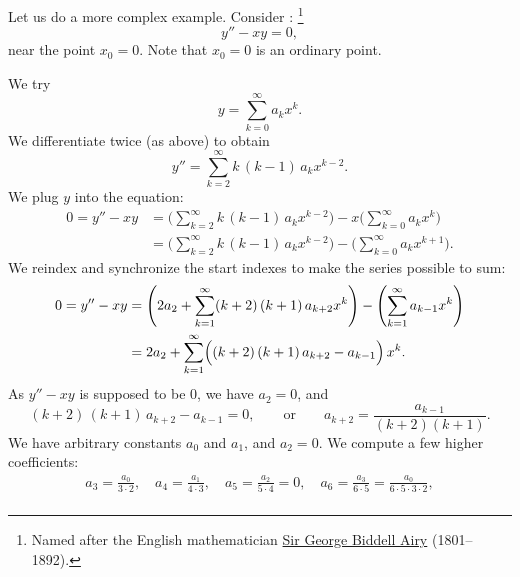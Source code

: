 \begin{example}
Let us do a more complex example.  Consider
\emph{}:%
\footnote{Named after the English mathematician
\href{http://en.wikipedia.org/wiki/George_Biddell_Airy}{Sir George Biddell Airy}
(1801--1892).}
\begin{equation*}
y'' - xy = 0 ,
\end{equation*}
near the point $x_0 = 0$.  Note that $x_0 = 0$ is an ordinary point.

\pagebreak[2]
We try
\begin{equation*}
y = \sum_{k=0}^\infty a_k x^k .
\end{equation*}
We differentiate twice (as above) to obtain
\begin{equation*}
y'' = \sum_{k=2}^\infty k\,(k-1) \, a_k x^{k-2} .
\end{equation*}
We plug $y$ into the equation:
\begin{equation*}
\begin{split}
0 = y''-xy &= 
\Biggl( \sum_{k=2}^\infty k\,(k-1) \, a_k x^{k-2}  \Biggr)
-
x
\Biggl( \sum_{k=0}^\infty a_k x^k \Biggr)
\\
&=
\Biggl( \sum_{k=2}^\infty k\,(k-1) \, a_k x^{k-2}  \Biggr)
-
\Biggl( \sum_{k=0}^\infty a_k x^{k+1} \Biggr) .
\end{split}
\end{equation*}
We reindex and synchronize the start indexes to make the series
possible to sum:
\begin{equation*}
\begin{split}
0 = y''-xy
&= 
\Biggl( 2 a_2 + \sum_{k=1}^\infty (k+2)\,(k+1) \, a_{k+2} x^k  \Biggr)
-
\Biggl( \sum_{k=1}^\infty a_{k-1} x^k \Biggr)
\\
&= 
2 a_2 + 
\sum_{k=1}^\infty \Bigl( (k+2)\,(k+1) \, a_{k+2} - a_{k-1} \Bigr) \, x^k .
\end{split}
\end{equation*}
As $y''-xy$ is supposed to be $0$, we have $a_2 = 0$, and
\begin{equation*}
(k+2)\,(k+1) \,a_{k+2} - a_{k-1} = 0 ,
\qquad
\text{or}
\qquad
a_{k+2} = \frac{a_{k-1}}{(k+2)(k+1)} .
\end{equation*}
We have arbitrary constants $a_0$ and $a_1$, and $a_2 = 0$.
We compute a few higher coefficients:
\begin{multline*}
a_3 = \frac{a_0}{3 \cdot 2}, \quad
a_4 = \frac{a_1}{4 \cdot 3}, \quad
a_5 = \frac{a_2}{5 \cdot 4} = 0, \quad
a_6 = \frac{a_3}{6 \cdot 5} = \frac{a_0}{6 \cdot 5 \cdot 3 \cdot 2},
\\

\end{multline*}
\end{example}
